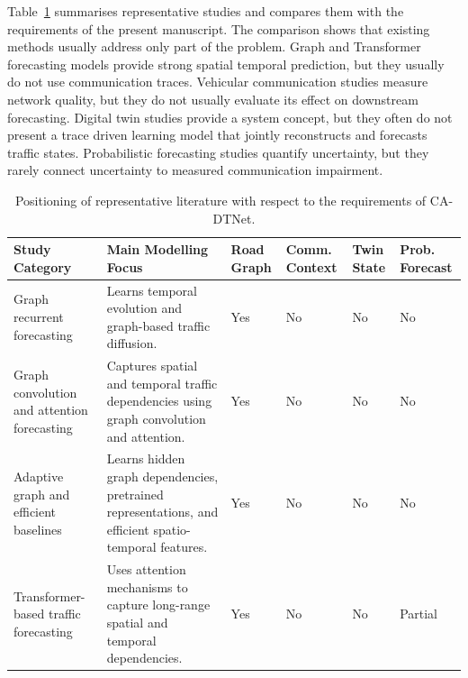 \documentclass[pdflatex,sn-mathphys-num]{sn-jnl}%
\theoremstyle{thmstyleone}%
\theoremstyle{thmstyletwo}%
\theoremstyle{thmstylethree}%
\begin{document}
Table~\ref{tab:related_work_summary} summarises representative studies and compares them with the requirements of the present manuscript. The comparison shows that existing methods usually address only part of the problem. Graph and Transformer forecasting models provide strong spatial temporal prediction, but they usually do not use communication traces. Vehicular communication studies measure network quality, but they do not usually evaluate its effect on downstream forecasting. Digital twin studies provide a system concept, but they often do not present a trace driven learning model that jointly reconstructs and forecasts traffic states. Probabilistic forecasting studies quantify uncertainty, but they rarely connect uncertainty to measured communication impairment.

\begin{table}[!htbp]
\caption{Positioning of representative literature with respect to the requirements of CA-DTNet.}
\label{tab:related_work_summary}
\centering
\footnotesize
\renewcommand{\arraystretch}{1.18}
\setlength{\tabcolsep}{3pt}

\begin{tabularx}{\linewidth}{
>{\RaggedRight\arraybackslash}p{2.5cm}
>{\RaggedRight\arraybackslash}X
>{\Centering\arraybackslash}p{1.0cm}
>{\Centering\arraybackslash}p{1.0cm}
>{\Centering\arraybackslash}p{1.0cm}
>{\Centering\arraybackslash}p{1.0cm}
}
\toprule
\textbf{Study Category} &
\textbf{Main Modelling Focus} &
\textbf{Road Graph} &
\textbf{Comm. Context} &
\textbf{Twin State} &
\textbf{Prob. Forecast} \\
\midrule

Graph recurrent forecasting
\cite{li2018dcrnn,bai2020agcrn}
&
Learns temporal evolution and graph-based traffic diffusion.
&
Yes & No & No & No \\

Graph convolution and attention forecasting
\cite{yu2018stgcn,guo2019astgcn,wu2019graphwavenet}
&
Captures spatial and temporal traffic dependencies using graph convolution and attention.
&
Yes & No & No & No \\

Adaptive graph and efficient baselines
\cite{wu2020mtgnn,cao2021stemgnn,shao2022stid,shao2022step,liu2023simst}
&
Learns hidden graph dependencies, pretrained representations, and efficient spatio-temporal features.
&
Yes & No & No & No \\

Transformer-based traffic forecasting
  \cite{zheng2020gman,yan2021traffictransformer,jiang2023pdformer,liu2023staeformer,wang2024stgformer,li2024stgaformer,zhang2024patchstg}
&
Uses attention mechanisms to capture long-range spatial and temporal dependencies.
&
Yes &
No &
No &
Partial \\


\end{tabularx}
\end{table}
\end{document}
